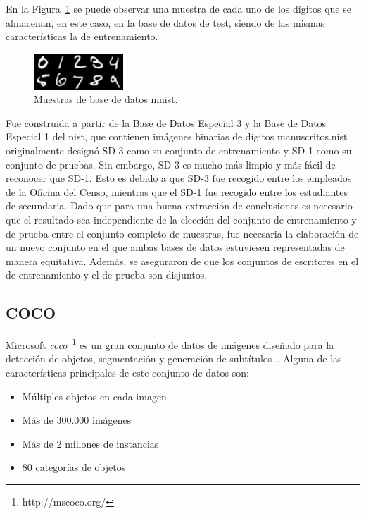En la Figura~\ref{fig.digitosMNIST} se puede observar una muestra de cada uno de los dígitos que se almacenan, en este caso, en la base de datos de test, siendo de las mismas características la de entrenamiento.

\begin{figure}[H]
	\begin{center}
		\includegraphics[width=0.3\textwidth]{figures/original}
		\caption{Muestras de base de datos \acrshort{mnist}.}
		\label{fig.digitosMNIST}
	\end{center}
\end{figure}

Fue construida a partir de la Base de Datos Especial 3 y la Base de Datos Especial 1 del \acrshort{nist}, que contienen imágenes binarias de dígitos manuscritos.\acrshort{nist} originalmente designó SD-3 como su conjunto de entrenamiento y SD-1 como su conjunto de pruebas. Sin embargo, SD-3 es mucho más limpio y más fácil de reconocer que SD-1. Esto es debido a que SD-3 fue recogido entre los empleados de la Oficina del Censo, mientras que el SD-1 fue recogido entre los estudiantes de secundaria. Dado que para una buena extracción de conclusiones es necesario que el resultado sea independiente de la elección del conjunto de entrenamiento y de prueba entre el conjunto completo de muestras, fue necesaria la elaboración de un nuevo conjunto en el que ambas bases de datos estuviesen representadas de manera equitativa. Además, se aseguraron de que los conjuntos de escritores en el de entrenamiento y el de prueba son disjuntos.

\subsection{COCO} \label{sec.coco}
Microsoft \textit{\acrfull{coco}}~\footnote{http://mscoco.org/} es un gran conjunto de datos de imágenes diseñado para la detección de objetos, segmentación y generación de subtítulos~\cite{veit2016cocotext}. Alguna de las características principales de este conjunto de datos son:
	\begin{itemize}
         \item Múltiples objetos en cada imagen
     	 \item Más de 300.000 imágenes
         \item Más de 2 millones de instancias
         \item 80 categorías de objetos
    \end{itemize}
    
